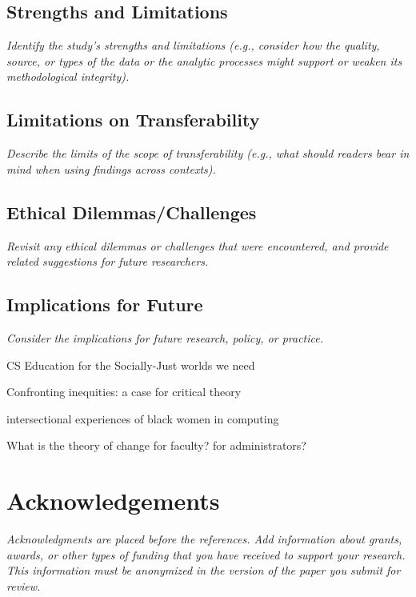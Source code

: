 \documentclass[acmsmall]{acmart}
\begin{document}
\subsection{Strengths and Limitations}

{\em\small Identify the study’s strengths and limitations (e.g., consider how the quality, source, or types of the data or the analytic processes might support or weaken its methodological integrity).}

\subsection{Limitations on Transferability}

{\em\small Describe the limits of the scope of transferability (e.g., what should readers bear in mind when using findings across contexts). }

\subsection{Ethical Dilemmas/Challenges}

{\em\small Revisit any ethical dilemmas or challenges that were encountered, and provide related suggestions for future researchers. }

\subsection{Implications for Future}

{\em\small Consider the implications for future research, policy, or practice.}

CS Education for the Socially-Just worlds we need

Confronting inequities: a case for critical theory

intersectional experiences of black women in computing

What is the theory of change for faculty? for administrators?

\section{Acknowledgements}

{\em\small Acknowledgments are placed before the references. Add information about grants, awards, or other types of funding that you have received to support your research. This information must be anonymized in the version of the paper you submit for review. }
\end{document}
